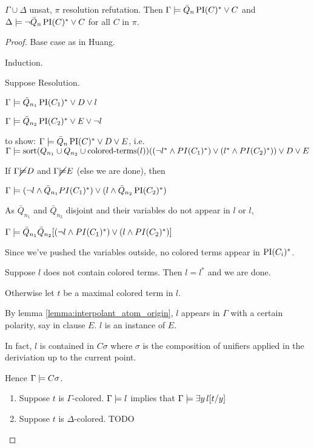 \documentclass[,%
	paper=a4,%
	DIV14, 
	liststotoc,
	bibtotoc,
	draft=false,%
	numbers=noendperiod
]{scrartcl}
\begin{document}
\begin{conj}
	$\Gamma \cup \Delta$ unsat, $\pi$ resolution refutation. Then $\Gamma \entails \bar Q_n \PI(C)^* \lor C$ and $\Delta \entails \lnot \bar Q_n \PI(C)^* \lor C$ for all $C$ in $\pi$.
\end{conj}
\begin{proof}
	Base case as in Huang.


	Induction.


Suppose Resolution.
	\begin{prooftree}
	\end{prooftree}

	$\Gamma \entails \bar Q_{n_1} \PI(C_1)^*  \lor D \lor l$

	$\Gamma \entails \bar Q_{n_2} \PI(C_2)^*  \lor E \lor \lnot l$

	to show:
	$\Gamma \entails \bar Q_n \PI(C)^* \lor D \lor E$, i.e.~
	\newline
	$\Gamma \entails \operatorname{sort}( Q_{n_1} \cup Q_{n_2} \cup \operatorname{colored-terms}(l)) ( (\lnot l^* \land  PI(C_1)^*) \lor (l^* \land PI(C_2)^*)  ) \lor D \lor E$


						If $\Gamma \cancel \entails D $ and 
						$\Gamma \cancel \entails E $ (else we are done), then  

						$\Gamma \entails  (\lnot l \land \bar Q_{n_1} PI(C_1)^*) \lor (l \land \bar Q_{n_2} \PI(C_2)^*)  $

						As $\bar Q_{n_1}$ and $\bar Q_{n_2}$ disjoint and their variables do not appear in $l$ or $l$,

						$\Gamma \entails \bar Q_{n_1} \bar Q_{n_2} [ (\lnot l \land  PI(C_1)^*) \lor (l \land PI(C_2)^*) ]  $

						Since we've pushed the variables outside, no colored terms appear in $\PI(C_i)^*$.

						Suppose $l$ does not contain colored terms. Then $l = l^*$ and we are done.

						Otherwise let $t$ be a maximal colored term in $l$.

						By lemma \ref{lemma:interpolant_atom_origin}, $l$ appears in $\Gamma$ with a certain polarity, say in clause $E$.
						$l$ is an instance of $E$.

						In fact, $l$ is contained in $C\sigma$ where $\sigma$ is the composition of unifiers applied in the deriviation up to the current point.

						Hence $\Gamma \entails C\sigma$.


						\begin{enumerate}
								\item Suppose $t$ is $\Gamma$-colored.
									$\Gamma \entails l$ implies that $\Gamma \entails \exists y\,l[t/y]$

								\item Suppose $t$ is $\Delta$-colored.
									TODO
						\end{enumerate}


\end{proof}
\end{document}
